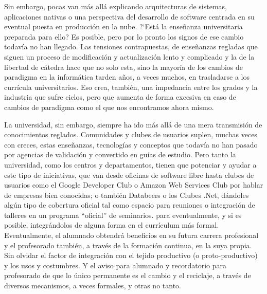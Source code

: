 \documentclass[twoside,10pt]{article}
\begin{document}
\begin{multicols}{2}
Sin embargo, pocas van m\'as all\'a explicando arquitecturas de sistemas,
aplicaciones nativas o una perspectiva del desarrollo de software centrada
en su eventual puesta en producci\'on en la nube. ?`Est\'a la ense\~nanza
universitaria preparada para ello? Es posible, pero
por lo pronto los signos de ese cambio todav\'ia no han llegado. Las
tensiones contrapuestas, de ense\~nanzas regladas que siguen un proceso
de modificaci\'on y actualizaci\'on lento y complicado y la de la libertad
de c\'atedra hace que no solo esta, sino la mayor\'ia de los cambios de
paradigma en la inform\'atica tarden a\~nos, a veces muchos, en trasladarse
a los curr\'icula
universitarios. Eso crea, tambi\'en, una impedancia entre los grados y
la industria que sufre ciclos, pero que aumenta de forma excesiva en
caso de cambios de paradigma como el que nos encontramos ahora mismo.

La universidad, sin embargo, siempre ha ido m\'as all\'a de una mera
transmisi\'on de conocimientos reglados. Comunidades y clubes de
usuarios suplen, muchas veces con creces, estas ense\~nanzas,
tecnolog\'ias y conceptos que todav\'ia no han pasado por agencias de
validaci\'on y convertido en gu\'ias de estudio. Pero tanto la
universidad, como los centros y  departamentos, tienen que
potenciar y ayudar a este tipo de iniciativas, que van desde oficinas
de software libre hasta clubes de usuarios como el Google Developer
Club o Amazon Web Services Club por hablar de empresas bien conocidas; o
tambi\'en Databeers o los Clubes .Net, 
d\'andoles alg\'un tipo de cobertura oficial tal como espacio
para reuniones o integración de talleres en un programa ``oficial'' de
seminarios. 
%
para eventualmente, y si es posible, integr\'andolos de alguna forma en el curr\'iculum
m\'as formal. Eventualmente, el alumnado obtendr\'a beneficios en su
futura carrera profesional y el profesorado tambi\'en, a trav\'es de la
formaci\'on continua, en la suya propia. 
Sin olvidar el factor de integraci\'on con el tejido productivo (o
proto-productivo) y los usos y costumbres. Y el aviso para alumnado y
recordatorio para profesorado de que lo \'unico
permanente es el cambio y el reciclaje, a trav\'es de diversos mecanismos,
a veces formales, y otras no tanto.


\end{multicols}
\end{document}
